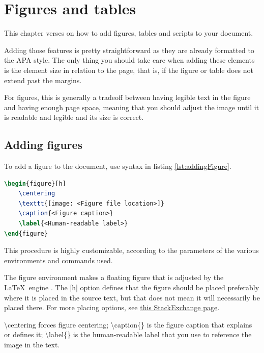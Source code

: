 \chapter{Figures and tables}

	This chapter verses on how to add figures, tables and scripts to your document.

	Adding those features is pretty straightforward as they are already formatted to the APA style. The only thing you should take care when adding these elements is the element size in relation to the page, that is, if the figure or table does not extend past the margins.

	For figures, this is generally a tradeoff between having legible text in the figure and having enough page space, meaning that you should adjust the image until it is readable and legible and its size is correct.

	\section{Adding figures}

	To add a figure to the document, use syntax in listing \ref{lst:addingFigure}.

\begin{lstlisting}[caption = {Adding a figure}, label = {lst:addingFigure}, style = prettyListing, language = tex]
\begin{figure}[h]
	\centering
	\texttt{[image: <Figure file location>]}
	\caption{<Figure caption>}
	\label{<Human-readable label>}
\end{figure}
\end{lstlisting}

	This procedure is highly customizable, according to the parameters of the various environments and commands used.

	 The {\ttfamily\small figure} environment makes a floating figure that is adjusted by the \LaTeX\ engine . The {\ttfamily\small [h]} option defines that the figure should be placed preferably where it is placed in the source text, but that does not mean it will necessarily be placed there. For more placing options, see \href{https://tex.stackexchange.com/questions/35125/how-to-use-the-placement-options-t-h-with-figures}{this StackExchange page}.

	{\ttfamily\small \textbackslash centering } forces figure centering; {\ttfamily\small \textbackslash caption\{\} } is the figure caption that explains or defines it; {\ttfamily\small \textbackslash label\{\} } is the human-readable label that you use to reference the image in the text.

